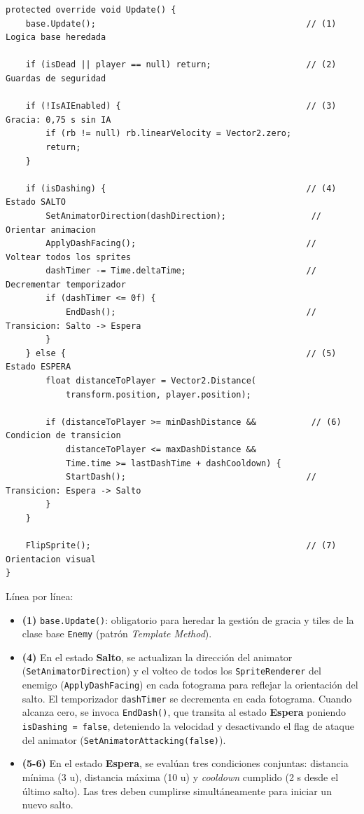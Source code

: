 \begin{lstlisting}
protected override void Update() {
    base.Update();                                          // (1) Logica base heredada
    
    if (isDead || player == null) return;                   // (2) Guardas de seguridad
    
    if (!IsAIEnabled) {                                     // (3) Gracia: 0,75 s sin IA
        if (rb != null) rb.linearVelocity = Vector2.zero;
        return;
    }
    
    if (isDashing) {                                        // (4) Estado SALTO
        SetAnimatorDirection(dashDirection);                 //     Orientar animacion
        ApplyDashFacing();                                  //     Voltear todos los sprites
        dashTimer -= Time.deltaTime;                        //     Decrementar temporizador
        if (dashTimer <= 0f) {
            EndDash();                                      //     Transicion: Salto -> Espera
        }
    } else {                                                // (5) Estado ESPERA
        float distanceToPlayer = Vector2.Distance(
            transform.position, player.position);
        
        if (distanceToPlayer >= minDashDistance &&           // (6) Condicion de transicion
            distanceToPlayer <= maxDashDistance &&
            Time.time >= lastDashTime + dashCooldown) {
            StartDash();                                    //     Transicion: Espera -> Salto
        }
    }
    
    FlipSprite();                                           // (7) Orientacion visual
}
\end{lstlisting}


Línea por línea:

\begin{itemize}
\item \textbf{(1)} \texttt{base.Update()}: obligatorio para heredar la gestión de gracia y tiles de la clase base \texttt{Enemy} (patrón \textit{Template Method}).
\item \textbf{(4)} En el estado \textbf{Salto}, se actualizan la dirección del animator (\texttt{SetAnimatorDirection}) y el volteo de todos los \texttt{SpriteRenderer} del enemigo (\texttt{ApplyDashFacing}) en cada fotograma para reflejar la orientación del salto. El temporizador \texttt{dashTimer} se decrementa en cada fotograma. Cuando alcanza cero, se invoca \texttt{EndDash()}, que transita al estado \textbf{Espera} poniendo \texttt{isDashing = false}, deteniendo la velocidad y desactivando el flag de ataque del animator (\texttt{SetAnimatorAttacking(false)}).
\item \textbf{(5-6)} En el estado \textbf{Espera}, se evalúan tres condiciones conjuntas: distancia mínima (3 u), distancia máxima (10 u) y \textit{cooldown} cumplido (2 s desde el último salto). Las tres deben cumplirse simultáneamente para iniciar un nuevo salto.
\end{itemize}

